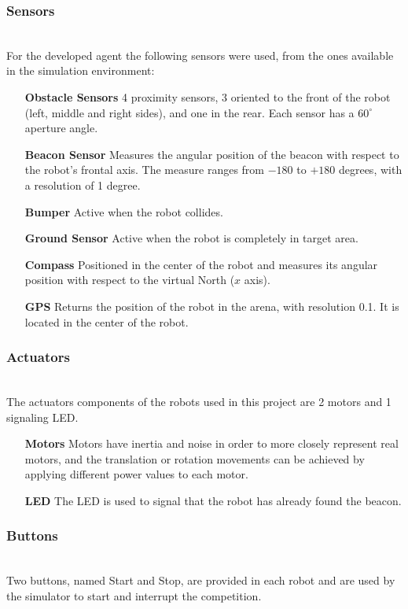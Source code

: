 \documentclass[oribibl]{llncs}
\begin{document}
\subsubsection{Sensors}\hfill \\
For the developed agent the following sensors were used, from the ones available in the simulation environment: 
\begin{itemize}
  \item[\textbf{Obstacle Sensors}]
  4 proximity sensors, 3 oriented to the front of the robot (left, middle and right sides), and one in the rear. Each sensor has a $60^{\circ}$ aperture angle.
  \item[\textbf{Beacon Sensor}]
  Measures the angular position of the beacon with respect to the robot's frontal axis. The measure ranges from $-180$ to $+180$ degrees, with a resolution of 1 degree.
  \item[\textbf{Bumper}]Active when the robot collides.
  \item[\textbf{Ground Sensor}]
  Active when the robot is completely in target area.
  \item[\textbf{Compass}]
  Positioned in the center of the robot and measures its angular position with respect to
the virtual North ($x$ axis).
  \item[\textbf{GPS}]
  Returns the position of the robot in the arena, with resolution 0.1. It is located in the center of the robot.
\end{itemize}

\subsubsection{Actuators}\hfill \\
The actuators components of the robots used in this project are 2 motors and 1 signaling LED. 
\begin{itemize}
  \item[\textbf{Motors}]
Motors have inertia and noise in order to more closely represent real motors, and the translation or rotation movements can be achieved by applying different power values to each motor.
  \item[\textbf{LED}]
The LED is used to signal that the robot has already found the beacon.
\end{itemize}

\subsubsection{Buttons}\hfill \\
Two buttons, named Start and Stop, are provided in each robot and are used by the simulator to start and interrupt the competition.
\end{document}

